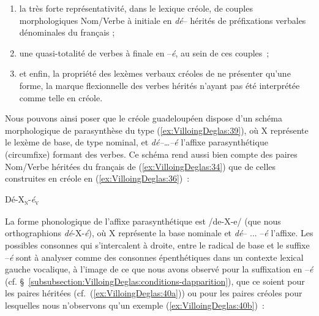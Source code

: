 \documentclass[output=paper]{langsci/langscibook}
\begin{document}
\begin{enumerate}
\def\labelenumi{\arabic{enumi})}

\item
  la très forte représentativité, dans le lexique créole, de couples
  morphologiques Nom/Verbe à initiale en \emph{dé}-- hérités de
  préfixations verbales dénominales du français ;
\item
  une quasi-totalité de verbes à finale en --\emph{é}, au sein de ces
  couples~;
\item
  et enfin, la propriété des lexèmes verbaux créoles de ne présenter
  qu'une forme, la marque flexionnelle des verbes hérités n'ayant pas
  été interprétée comme telle en créole.
\end{enumerate}

Nous pouvons ainsi poser que le créole guadeloupéen dispose d'un schéma
morphologique de parasynthèse du type (\ref{ex:VilloingDeglas:39}), où X représente le lexème de
base, de type nominal, et \emph{dé--\ldots{}--\emph{é}} l'affixe parasynthétique
(circumfixe) formant des verbes. Ce schéma rend aussi bien compte des
paires Nom/Verbe héritées du français de (\ref{ex:VilloingDeglas:34}) que de celles construites
en créole en (\ref{ex:VilloingDeglas:36})~:

\ea \label{ex:VilloingDeglas:39} Dé-X\textsubscript{\textsc{n}}-\emph{é}\textsubscript{\textsc{v}} 
\z

\label{forme-phonologique-de-laffixe}

La forme phonologique de l'affixe parasynthétique est /de-X-e/ (que nous
orthographions \emph{dé}-X-\emph{é}), où X représente la base nominale et \emph{dé}-- ... --\emph{é}
l'affixe. Les possibles con\-sonnes qui s'intercalent à droite, entre le
radical de base et le suffixe --\emph{é} sont à analyser comme des
consonnes épenthétiques dans un contexte lexical gauche vocalique, à
l'image de ce que nous avons observé pour la suffixation en --\emph{é}
(cf. §~\ref{subsubsection:VilloingDeglas:conditions-dapparition}), que ce soient pour les paires héritées (cf.~(\ref{ex:VilloingDeglas:40a})) ou
pour les paires créoles pour lesquelles nous n'observons qu'un exemple
(\ref{ex:VilloingDeglas:40b})~:
\end{document}
